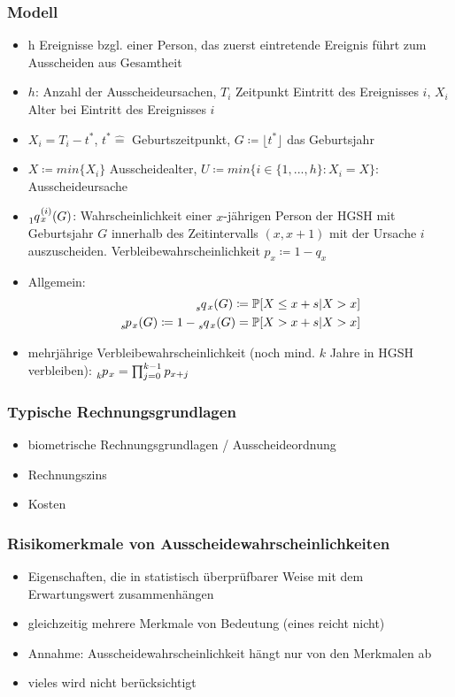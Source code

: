 \documentclass[12pt]{report}
\theoremstyle{dotless}
\theoremstyle{definition}
\begin{document}
\subsubsection{Modell}
\begin{itemize}
	\item h Ereignisse bzgl. einer Person, das zuerst eintretende Ereignis führt zum Ausscheiden aus Gesamtheit
	\item $h$: Anzahl der Ausscheideursachen, $T_i$ Zeitpunkt Eintritt des Ereignisses $i$, $X_i$ Alter bei Eintritt des Ereignisses $i$
	\item $X_i = T_i-t^*$, $t^* \hat{=}$ Geburtszeitpunkt, $G \coloneqq \lfloor t^* \rfloor$ das Geburtsjahr
	\item $X\coloneqq min\{X_i\}$ Ausscheidealter, $U\coloneqq min\{i \in \{1,...,h\}:X_i=X\}$: Ausscheideursache
	\item $\tensor[_{1}]{q}{}_x^{(i)}(G)$: Wahrscheinlichkeit einer $x$-jährigen Person der HGSH mit Geburtsjahr $G$ innerhalb des Zeitintervalls $(x,x+1)$ mit der Ursache $i$ auszuscheiden. Verbleibewahrscheinlichkeit $p_x \coloneqq 1-q_x$
	\item Allgemein: 
	\begin{align}
		\tensor[_{s}]{q}{}_x(G)\coloneqq \mathbb{P}[X \leq x+s | X>x] \\
		\tensor[_{s}]{p}{}_x(G) \coloneqq 1-\tensor[_{s}]{q}{}_x(G) = \mathbb{P}[X>x+s|X>x]
	\end{align}
	\item mehrjährige Verbleibewahrscheinlichkeit (noch mind. $k$ Jahre in HGSH verbleiben): $\tensor[_{k}]{p}{}_x = \prod_{j=0}^{k-1}p_{x+j}$
\end{itemize}

\subsubsection{Typische Rechnungsgrundlagen}
\begin{itemize}
	\item biometrische Rechnungsgrundlagen / Ausscheideordnung
	\item Rechnungszins
	\item Kosten
\end{itemize}

\subsubsection{Risikomerkmale von Ausscheidewahrscheinlichkeiten}
\begin{itemize}
	\item Eigenschaften, die in statistisch überprüfbarer Weise mit dem Erwartungswert zusammenhängen
	\item gleichzeitig mehrere Merkmale von Bedeutung (eines reicht nicht)
	\item Annahme: Ausscheidewahrscheinlichkeit hängt nur von den Merkmalen ab
	\item vieles wird nicht berücksichtigt
\end{itemize}
\end{document}

